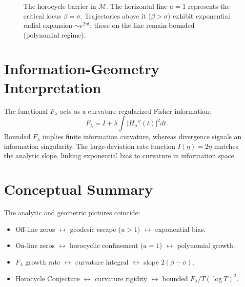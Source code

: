 \begin{figure}[h]
\centering
{}
\caption{The horocycle barrier in $\mathcal{M}$.
The horizontal line $u=1$ represents the critical locus $\beta=\sigma$.
Trajectories above it ($\beta>\sigma$) exhibit exponential radial expansion
$\sim e^{2\eta t}$; those on the line remain bounded (polynomial regime).}
\label{fig:horocycle}
\end{figure}

\section{Information-Geometry Interpretation}

The functional $F_\lambda$ acts as a curvature-regularized Fisher information:
\[
F_\lambda = I + \lambda\!\int |H_\sigma''(t)|^2 dt.
\]
Bounded $F_\lambda$ implies finite information curvature,
whereas divergence signals an information singularity.
The large-deviation rate function $I(\eta)=2\eta$ matches the analytic slope,
linking exponential bias to curvature in information space.

\section{Conceptual Summary}

The analytic and geometric pictures coincide:
\begin{itemize}
\item Off-line zeros $\leftrightarrow$ geodesic escape ($u>1$) $\leftrightarrow$
      exponential bias.
\item On-line zeros $\leftrightarrow$ horocyclic confinement ($u=1$)
      $\leftrightarrow$ polynomial growth.
\item $F_\lambda$ growth rate $\leftrightarrow$
      curvature integral $\leftrightarrow$ slope $2(\beta-\sigma)$.
\item Horocycle Conjecture $\leftrightarrow$
      curvature rigidity $\leftrightarrow$ bounded $F_\lambda/T(\log T)^2$.
\end{itemize}

